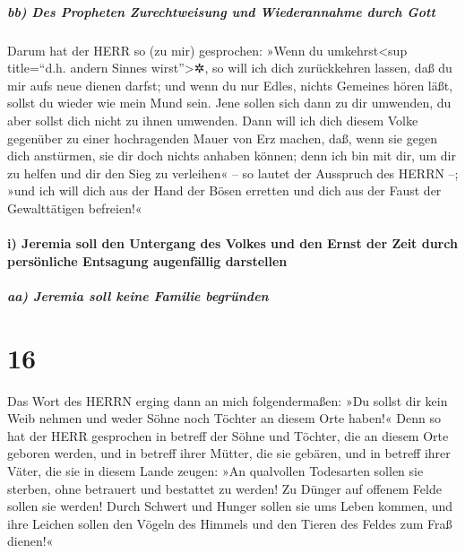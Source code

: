 \hypertarget{bb-des-propheten-zurechtweisung-und-wiederannahme-durch-gott}{%
\subparagraph{bb) Des Propheten Zurechtweisung und Wiederannahme durch
Gott}\label{bb-des-propheten-zurechtweisung-und-wiederannahme-durch-gott}}

Darum hat der HERR so (zu mir) gesprochen: »Wenn du
umkehrst\textless sup title=``d.h. andern Sinnes wirst''\textgreater✲,
so will ich dich zurückkehren lassen, daß du mir aufs neue dienen
darfst; und wenn du nur Edles, nichts Gemeines hören läßt, sollst du
wieder wie mein Mund sein. Jene sollen sich dann zu dir umwenden, du
aber sollst dich nicht zu ihnen umwenden. Dann will ich
dich diesem Volke gegenüber zu einer hochragenden Mauer von Erz machen,
daß, wenn sie gegen dich anstürmen, sie dir doch nichts anhaben können;
denn ich bin mit dir, um dir zu helfen und dir den Sieg zu verleihen« --
so lautet der Ausspruch des HERRN --; »und ich will dich
aus der Hand der Bösen erretten und dich aus der Faust der Gewalttätigen
befreien!«

\hypertarget{i-jeremia-soll-den-untergang-des-volkes-und-den-ernst-der-zeit-durch-persuxf6nliche-entsagung-augenfuxe4llig-darstellen}{%
\paragraph{i) Jeremia soll den Untergang des Volkes und den Ernst der
Zeit durch persönliche Entsagung augenfällig
darstellen}\label{i-jeremia-soll-den-untergang-des-volkes-und-den-ernst-der-zeit-durch-persuxf6nliche-entsagung-augenfuxe4llig-darstellen}}

\hypertarget{aa-jeremia-soll-keine-familie-begruxfcnden}{%
\subparagraph{aa) Jeremia soll keine Familie
begründen}\label{aa-jeremia-soll-keine-familie-begruxfcnden}}

\hypertarget{section-15}{%
\section{16}\label{section-15}}

Das Wort des HERRN erging dann an mich folgendermaßen:
»Du sollst dir kein Weib nehmen und weder Söhne noch
Töchter an diesem Orte haben!« Denn so hat der HERR
gesprochen in betreff der Söhne und Töchter, die an diesem Orte geboren
werden, und in betreff ihrer Mütter, die sie gebären, und in betreff
ihrer Väter, die sie in diesem Lande zeugen: »An
qualvollen Todesarten sollen sie sterben, ohne betrauert und bestattet
zu werden! Zu Dünger auf offenem Felde sollen sie werden! Durch Schwert
und Hunger sollen sie ums Leben kommen, und ihre Leichen sollen den
Vögeln des Himmels und den Tieren des Feldes zum Fraß dienen!«

